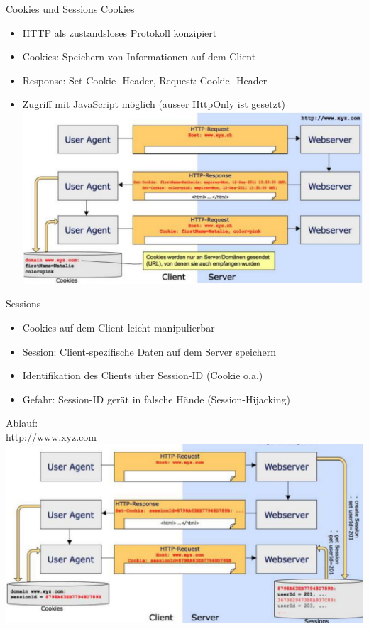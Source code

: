\begin{definition}{Cookies und Sessions}
Cookies

\begin{itemize}
  \item HTTP als zustandsloses Protokoll konzipiert
  \item Cookies: Speichern von Informationen auf dem Client
  \item Response: Set-Cookie -Header, Request: Cookie -Header
  \item Zugriff mit JavaScript möglich (ausser HttpOnly ist gesetzt)\\
\includegraphics[width=\linewidth]{images/2024_12_29_858f09cde51177c71657g-31}
\end{itemize}
\end{definition}

\begin{definition}{Sessions}
\begin{itemize}
  \item Cookies auf dem Client leicht manipulierbar
  \item Session: Client-spezifische Daten auf dem Server speichern
  \item Identifikation des Clients über Session-ID (Cookie o.a.)
  \item Gefahr: Session-ID gerät in falsche Hände (Session-Hijacking)
\end{itemize}
\end{definition}
Ablauf:\\
\href{http://www.xyz.com}{http://www.xyz.com}\\
\includegraphics[width=\linewidth]{images/2024_12_29_858f09cde51177c71657g-31(1)}

